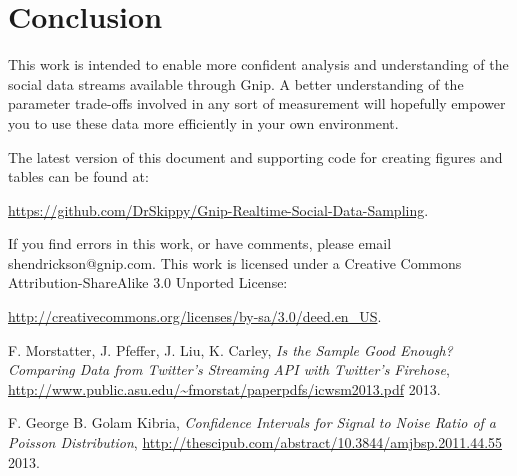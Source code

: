 \documentclass{article}
\begin{document}
\section{Conclusion} 

This work is intended to enable more confident analysis and understanding of the social data 
streams available through Gnip. A better understanding of the parameter trade-offs involved 
in any sort of measurement will hopefully empower you to use these data more efficiently in 
your own environment.

The latest version of this document and supporting code for creating figures and tables 
can be found at:

\noindent \url{https://github.com/DrSkippy/Gnip-Realtime-Social-Data-Sampling}.

If you find errors in this work, or have comments, please email shendrickson@gnip.com. This 
work is licensed under a Creative Commons Attribution-ShareAlike 3.0 Unported License:

\noindent \url{http://creativecommons.org/licenses/by-sa/3.0/deed.en_US}.


\begin{thebibliography}{2013}



 F. Morstatter, J. Pfeffer, J. Liu, K. Carley, \textsl{Is the Sample Good Enough? Comparing Data from Twitter’s Streaming API with Twitter’s Firehose}, \url{http://www.public.asu.edu/~fmorstat/paperpdfs/icwsm2013.pdf} 2013.

 F. George B. Golam Kibria, \textsl{Confidence Intervals for Signal to Noise Ratio of
a Poisson Distribution}, \url{http://thescipub.com/abstract/10.3844/amjbsp.2011.44.55} 2013.

\end{thebibliography}
\end{document}

